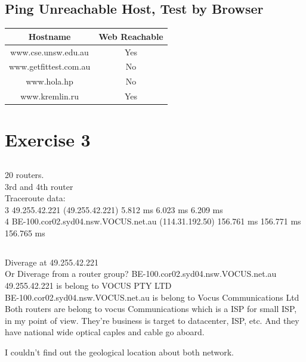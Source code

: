 \documentclass{article}
\begin{document}
\subsection{Ping Unreachable Host, Test by Browser}
\begin{tabular}{|c|c|}
    \hline
    Hostname & Web Reachable\\
    \hline
    www.cse.unsw.edu.au   &Yes \\
    www.getfittest.com.au &No \\
    www.hola.hp           &No \\
    www.kremlin.ru        &Yes \\
    \hline
\end{tabular}

\section{Exercise 3}
\subsection{}
20 routers.\\
3rd and 4th router \\
Traceroute data:\\
 3  49.255.42.221 (49.255.42.221)  5.812 ms  6.023 ms  6.209 ms\\
 4  BE-100.cor02.syd04.nsw.VOCUS.net.au (114.31.192.50)  156.761 ms  156.771 ms  156.765 ms

\subsection{}
Diverage at 49.255.42.221\\
Or Diverage from a router group? BE-100.cor02.syd04.nsw.VOCUS.net.au \\
49.255.42.221 is belong to VOCUS PTY LTD\\
BE-100.cor02.syd04.nsw.VOCUS.net.au is belong to Vocus Communications Ltd\\

Both routers are belong to vocus Communications which is a ISP for small ISP, in my point of view. They're business is target to datacenter, ISP, etc. And they have national wide optical caples and cable go aboard.

I couldn't find out the geological location about both network.
\end{document}
